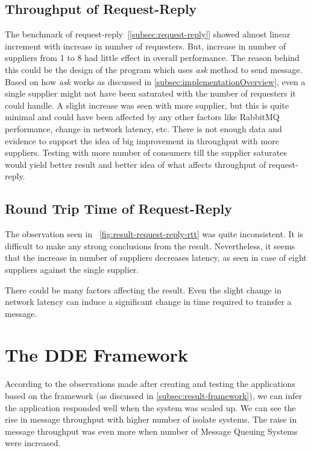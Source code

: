 \subsection{Throughput of Request-Reply}
  The benchmark of request-reply~[\autoref{subsec:request-reply}] showed almost linear increment with increase in number of requesters. But, increase in number of suppliers from 1 to 8 had little effect in overall performance. The reason behind this could be the design of the program which uses \emph{ask} method to send message. Based on how \emph{ask} works as discussed in \autoref{subsec:implementationOverview}, even a single supplier might not have been saturated with the number of requesters it could handle. A slight increase was seen with more supplier, but this is quite minimal and could have been affected by any other factors like RabbitMQ performance, change in network latency, etc. There is not enough data and evidence to support the idea of big improvement in throughput with more suppliers. Testing with more number of consumers till the supplier saturates would yield better result and better idea of what affects throughput of request-reply.

\subsection{Round Trip Time of Request-Reply}
  The observation seen in ~\autoref{fig:result-request-reply-rtt} was quite inconsistent. It is difficult to make any strong conclusions from the result. Nevertheless, it seems that the increase in number of suppliers decreases latency, as seen in case of eight suppliers against the single supplier.

  There could be many factors affecting the result. Even the slight change in network latency can induce a significant change in time required to transfer a message.

\section{The DDE Framework}
  According to the observations made after creating and testing the applications based on the framework (as discussed in \autoref{subsec:result-framework}), we can infer the application responded well when the system was scaled up. We can see the rise in message throughput with higher number of isolate systems. The raise in message throughput was even more when number of Message Queuing Systems were increased.

